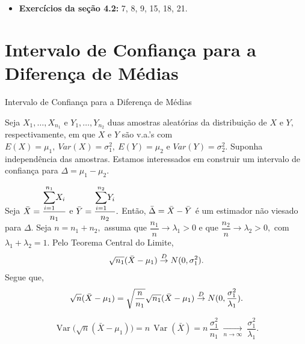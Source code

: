 \documentclass[12pt]{beamer}
\begin{document}
\begin{frame}{\Home}
\begin{block}{}
\justifying

\begin{itemize}
    \item \textbf{Exercícios da seção 4.2:} 7, 8, 9, 15, 18, 21.
\end{itemize}

\end{block}
\end{frame}

\section{Intervalo de Confiança para a Diferença de Médias}
\begin{frame}{Intervalo de Confiança para a Diferença de Médias}
\begin{block}{}
\justifying
Seja $X_{1},\ldots,X_{n_{1}}$ e $Y_{1},\ldots,Y_{n_{2}}$ duas amostras aleatórias da distribuição de $X$ e $Y,$ respectivamente, em que $X$ e $Y$ são v.a.'s com $E(X)=\mu_{1},~Var(X)=\sigma_{1}^{2},~E(Y)=\mu_{2}$ e $Var(Y)=\sigma^{2}_{2}.$ Suponha independência das amostras. Estamos interessados em construir um intervalo de confiança para $\Delta=\mu_{1}-\mu_{2}.$
\end{block}
\end{frame}

\begin{frame}{}
\begin{block}{}
\justifying
Seja $\Bar{X}=\dfrac{{\displaystyle \sum_{i=1}^{n_{1}}} X_{i}}{n_{1}}$ e $\Bar{Y}=\dfrac{{\displaystyle \sum_{i=1}^{n_{2}}} Y_{i}}{n_{2}}.$ Então, $\Bar{\Delta}=\Bar{X}-\Bar{Y}$ é um estimador não viesado para $\Delta.$ Seja $n=n_{1}+n_{2},$ assuma que $\dfrac{n_{1}}{n}\xrightarrow{} \lambda_{1}>0$ e que $\dfrac{n_{2}}{n}\xrightarrow{} \lambda_{2}>0,$ com $\lambda_{1}+\lambda_{2}=1.$ Pelo Teorema Central do Limite,
\begin{align*}
\sqrt{n_{1}}(\Bar{X}-\mu_{1})\overset{D}{\rightarrow} N(0,\sigma_{1}^{2}).
\end{align*}
Segue que,
\begin{align*}
\sqrt{n}(\Bar{X}-\mu_{1})=\sqrt{\dfrac{n}{n_{1}}}\sqrt{n_{1}}(\Bar{X}-\mu_{1})\overset{D}{\rightarrow} N(0,\dfrac{\sigma_{1}^{2}}{\lambda_{1}}).
\end{align*}
\end{block}
\pause
\begin{block}{}
\justifying
\[
\operatorname{Var}\!\big(\sqrt{n}(\bar X-\mu_{1})\big)
= n\,\operatorname{Var}(\bar X)
= n\,\frac{\sigma_{1}^{2}}{n_{1}}
\;\xrightarrow[n\to\infty]{}\;
\frac{\sigma_{1}^{2}}{\lambda_{1}}.
\]
\end{block}
\end{frame}
\end{document}
